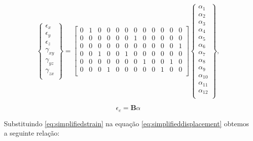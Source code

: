 \begin{equation} \label{eq:matrixalphadisplacement}
    \begin{Bmatrix}
        \epsilon_{x} \\
        \epsilon_{y} \\
        \epsilon_{z} \\
        \gamma_{xy} \\
        \gamma_{yz} \\
        \gamma_{zx} \\
    \end{Bmatrix}
    = 
    \begin{bmatrix}
    0 & 1 & 0 & 0 & 0 & 0 & 0 & 0 & 0 & 0 & 0 & 0 \\
    0 & 0 & 0 & 0 & 0 & 0 & 1 & 0 & 0 & 0 & 0 & 0 \\
    0 & 0 & 0 & 0 & 0 & 0 & 0 & 0 & 0 & 0 & 0 & 1 \\

    0 & 0 & 1 & 0 & 0 & 1 & 0 & 0 & 0 & 0 & 0 & 0 \\
    0 & 0 & 0 & 0 & 0 & 0 & 0 & 1 & 0 & 0 & 1 & 0 \\
    0 & 0 & 0 & 1 & 0 & 0 & 0 & 0 & 0 & 1 & 0 & 0 \\
    
    \end{bmatrix}
    \begin{Bmatrix}
        \alpha_{1} \\
        \alpha_{2} \\
        \alpha_{3} \\
        \alpha_{4} \\
        \alpha_{5} \\
        \alpha_{6} \\
        \alpha_{7} \\
        \alpha_{8} \\
        \alpha_{9} \\
        \alpha_{10} \\
        \alpha_{11} \\
        \alpha_{12} \\
    \end{Bmatrix}
    ,
\end{equation}
    
\begin{equation} \label{eq:simplifiedstrain}
    \epsilon_{e} = \pmb{B}\alpha
\end{equation}    

Substituindo \ref{eq:simplifiedstrain} na equação \ref{eq:simplifieddisplacement} obtemos a seguinte relação:

